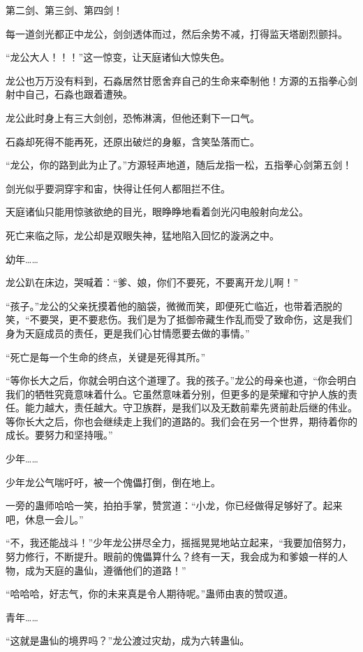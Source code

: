 \begin{this_body}
第二剑、第三剑、第四剑！

每一道剑光都正中龙公，剑剑透体而过，然后余势不减，打得监天塔剧烈颤抖。

“龙公大人！！！”这一惊变，让天庭诸仙大惊失色。

龙公也万万没有料到，石淼居然甘愿舍弃自己的生命来牵制他！方源的五指拳心剑射中自己，石淼也跟着遭殃。

龙公此时身上有三大剑创，恐怖淋漓，但他还剩下一口气。

石淼却死得不能再死，还原出破烂的身躯，含笑坠落而亡。

“龙公，你的路到此为止了。”方源轻声地道，随后龙指一松，五指拳心剑第五剑！

剑光似乎要洞穿宇和宙，快得让任何人都阻拦不住。

天庭诸仙只能用惊骇欲绝的目光，眼睁睁地看着剑光闪电般射向龙公。

死亡来临之际，龙公却是双眼失神，猛地陷入回忆的漩涡之中。

幼年……

龙公趴在床边，哭喊着：“爹、娘，你们不要死，不要离开龙儿啊！”

“孩子。”龙公的父亲抚摸着他的脑袋，微微而笑，即便死亡临近，也带着洒脱的笑，“不要哭，更不要悲伤。我们是为了抵御帝藏生作乱而受了致命伤，这是我们身为天庭成员的责任，更是我们心甘情愿要去做的事情。”

“死亡是每一个生命的终点，关键是死得其所。”

“等你长大之后，你就会明白这个道理了。我的孩子。”龙公的母亲也道，“你会明白我们的牺牲究竟意味着什么。它虽然意味着分别，但更多的是荣耀和守护人族的责任。能力越大，责任越大。守卫族群，是我们以及无数前辈先贤前赴后继的伟业。等你长大之后，你也会继续走上我们的道路的。我们会在另一个世界，期待着你的成长。要努力和坚持哦。”

少年……

少年龙公气喘吁吁，被一个傀儡打倒，倒在地上。

一旁的蛊师哈哈一笑，拍拍手掌，赞赏道：“小龙，你已经做得足够好了。起来吧，休息一会儿。”

“不，我还能战斗！”少年龙公拼尽全力，摇摇晃晃地站立起来，“我要加倍努力，努力修行，不断提升。眼前的傀儡算什么？终有一天，我会成为和爹娘一样的人物，成为天庭的蛊仙，遵循他们的道路！”

“哈哈哈，好志气，你的未来真是令人期待呢。”蛊师由衷的赞叹道。

青年……

“这就是蛊仙的境界吗？”龙公渡过灾劫，成为六转蛊仙。


\end{this_body}
